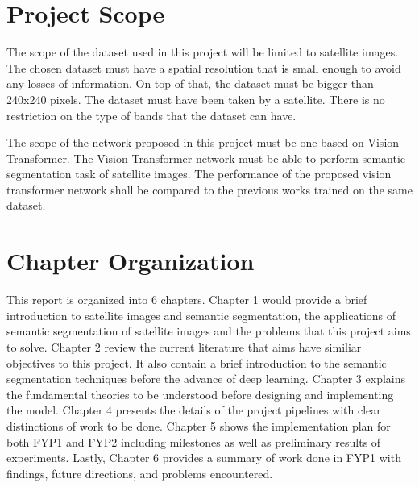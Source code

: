 \section{Project Scope}

The scope of the dataset used in this project will be limited to satellite images. The chosen dataset must have a spatial resolution that is small enough to avoid any losses of information. On top of that, the dataset must be bigger than 240x240 pixels. The dataset must have been taken by a satellite. There is no restriction on the type of bands that the dataset can have.

The scope of the network proposed in this project must be one based on Vision Transformer.  The Vision Transformer network must be able to perform semantic segmentation task of satellite images. The performance of the proposed vision transformer network shall be compared to the  previous works trained on the same dataset.

\section{Chapter Organization}

This report is organized into 6 chapters. Chapter 1 would provide a brief introduction to satellite images and semantic segmentation, the applications of semantic segmentation of satellite images and the problems that this project aims to solve. Chapter 2 review the current literature that aims have similiar objectives to this project. It also contain a brief introduction to the semantic segmentation techniques before the advance of deep learning. Chapter 3 explains the fundamental theories to be understood before designing and implementing the model. Chapter 4 presents
the details of the project pipelines with clear distinctions of work to be done. Chapter 5
shows the implementation plan for both FYP1 and FYP2 including milestones as well
as preliminary results of experiments. Lastly, Chapter 6 provides a summary of work
done in FYP1 with findings, future directions, and problems encountered.
